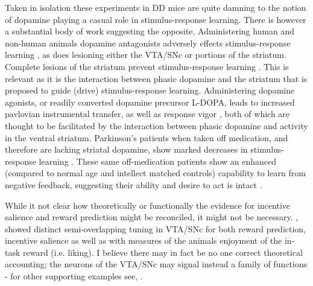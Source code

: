 \documentclass[doc,12pt]{apa}        %
\begin{document}
Taken in isolation these experiments in DD mice are quite damning to the notion of dopamine playing a casual role in stimulus-response learning.  There is however a substantial body of work suggesting the opposite.  Administering human and non-human animals dopamine antagonists adversely effects stimulus-response learning \cite{Pizzagalli:2010p7205}, as does lesioning either the VTA/SNc or portions of the striatum.  Complete lesions of the striatum prevent stimulus-response learning \cite{Packard:2002p5074}.  This is relevant as it is the interaction between phasic dopamine and the striatum that is proposed to guide (drive) stimulus-response learning. Administering dopamine agonists, or readily converted dopamine precursor L-DOPA, leads to increased pavlovian instrumental transfer, as well as response vigor \cite{Winterbauer:2007p6352}, both of which are thought to be facilitated by the interaction between phasic dopamine and activity in the ventral striatum.  Parkinson's patients when taken off medication, and therefore are lacking striatal dopamine, show marked decreases in stimulus-response learning \cite{Pizzagalli:2010p7205}.  These same off-medication patients show an enhanced (compared to normal age and intellect matched controls) capability to learn from negative feedback, suggesting their ability and desire to act is intact \cite{Frank:2004p4709}.

While it not clear how theoretically or functionally the evidence for incentive salience and reward prediction might be reconciled, it might not be necessary.  , showed distinct semi-overlapping tuning in VTA/SNc for both reward prediction, incentive salience as well as with measures of the animals enjoyment of the in-task reward (i.e. liking).  I believe there may in fact be no one correct theoretical accounting; the neurons of the VTA/SNc may signal instead a family of functions - for other supporting examples see, .


\end{document}
